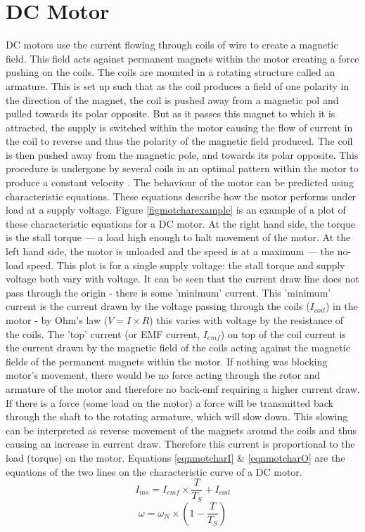 \documentclass[twoside,a4]{report}
\def\br{\newline \newline \noindent}
\begin{document}
	\section*{DC Motor}
	DC motors use the current flowing through coils of wire to create a magnetic field. This field acts against permanent magnets within the motor creating a force pushing on the coils. The coils are mounted in a rotating structure called an armature. This is set up such that as the coil produces a field of one polarity in the direction of the magnet, the coil is pushed away from a magnetic pol and pulled towards its polar opposite. But as it passes this magnet to which it is attracted, the supply is switched within the motor causing the flow of current in the coil to reverse and thus the polarity of the magnetic field produced. The coil is then pushed away from the magnetic pole, and towards its polar opposite. This procedure is undergone by several coils in an optimal pattern within the motor to produce a constant velocity \cite{backdcmotor}.
	\br
	The behaviour of the motor can be predicted using characteristic equations. These equations describe how the motor performs under load at a supply voltage. Figure \ref{figmotcharexample} is an example of a plot of these characteristic equations for a DC motor. At the right hand side, the torque is the stall torque --- a load high enough to halt movement of the motor. At the left hand side, the motor is unloaded and the speed is at a maximum --- the no-load speed. This plot is for a single supply voltage: the stall torque and supply voltage both vary with voltage. 
	\br
	It can be seen that the current draw line does not pass through the origin - there is some 'minimum' current. This 'minimum' current is the current drawn by the voltage passing through the coils ($I_{coil}$) in the motor - by Ohm's law ($V = I \times R$) this varies with voltage by the resistance of the coils. The 'top' current (or EMF current, $I_{emf}$) on top of the coil current is the current drawn by the magnetic field of the coils acting against the magnetic fields of the permanent magnets within the motor. If nothing was blocking motor's movement, there would be no force acting through the rotor and armature of the motor and therefore no back-emf requiring a higher current draw. If there is a force (some load on the motor) a force will be transmitted back through the shaft to the rotating armature, which will slow down. This slowing can be interpreted as reverse movement of the magnets around the coils and thus causing an increase in current draw. Therefore this current is proportional to the load (torque) on the motor. Equations \ref{eqnmotcharI} \& \ref{eqnmotcharO} are the equations of the two lines on the characteristic curve of a DC motor.
	\begin{equation}
		I_{ms} = I_{emf} \times \frac{T}{T_S} + I_{coil}
		\label{eqnmotcharI}
	\end{equation}
	\begin{equation}
		\omega = \omega_N \times \left(1 - \frac{T}{T_S}\right)
		\label{eqnmotcharO}
	\end{equation}
	
\end{document}
